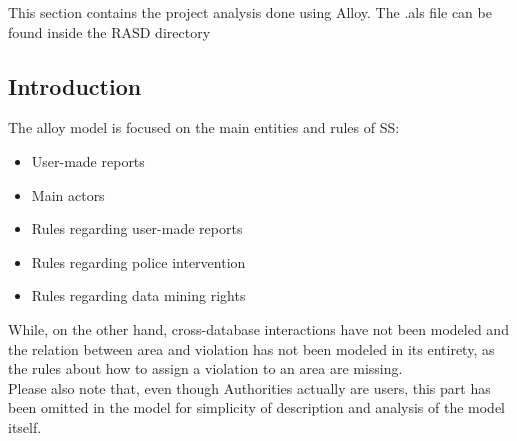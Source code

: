 
This section contains the project analysis done using Alloy. The .als file can be found inside the RASD directory \\
\subsection{Introduction}
The alloy model is focused on the main entities and rules of SS:
\begin{itemize}
	\item User-made reports
	\item Main actors
	\item Rules regarding user-made reports
	\item Rules regarding police intervention
	\item Rules regarding data mining rights
\end{itemize}
While, on the other hand, cross-database interactions have not been modeled and the relation between area and violation has not been modeled in its entirety, as the rules about how to assign a violation to an area are missing.\\
Please also note that, even though Authorities actually are users, this part has been omitted in the model for simplicity of description and analysis of the model itself.\\  
\\
